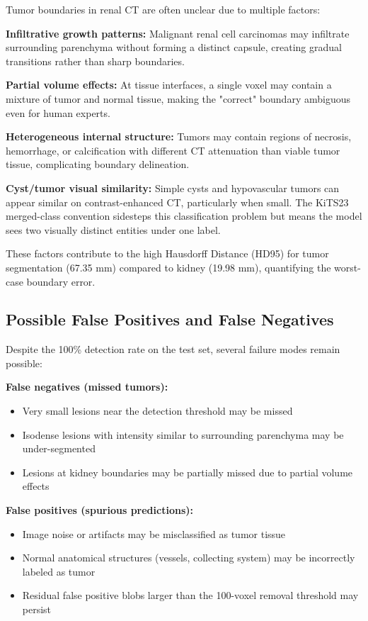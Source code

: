 Tumor boundaries in renal CT are often unclear due to multiple factors:

\textbf{Infiltrative growth patterns:} Malignant renal cell carcinomas may infiltrate surrounding parenchyma without forming a distinct capsule, creating gradual transitions rather than sharp boundaries.

\textbf{Partial volume effects:} At tissue interfaces, a single voxel may contain a mixture of tumor and normal tissue, making the "correct" boundary ambiguous even for human experts.

\textbf{Heterogeneous internal structure:} Tumors may contain regions of necrosis, hemorrhage, or calcification with different CT attenuation than viable tumor tissue, complicating boundary delineation.

\textbf{Cyst/tumor visual similarity:} Simple cysts and hypovascular tumors can appear similar on contrast-enhanced CT, particularly when small. The KiTS23 merged-class convention sidesteps this classification problem but means the model sees two visually distinct entities under one label.

These factors contribute to the high Hausdorff Distance (HD95) for tumor segmentation (67.35 mm) compared to kidney (19.98 mm), quantifying the worst-case boundary error.

\subsection{Possible False Positives and False Negatives}

Despite the 100\% detection rate on the test set, several failure modes remain possible:

\textbf{False negatives (missed tumors):}
\begin{itemize}
    \item Very small lesions near the detection threshold may be missed
    \item Isodense lesions with intensity similar to surrounding parenchyma may be under-segmented
    \item Lesions at kidney boundaries may be partially missed due to partial volume effects
\end{itemize}

\textbf{False positives (spurious predictions):}
\begin{itemize}
    \item Image noise or artifacts may be misclassified as tumor tissue
    \item Normal anatomical structures (vessels, collecting system) may be incorrectly labeled as tumor
    \item Residual false positive blobs larger than the 100-voxel removal threshold may persist
\end{itemize}


